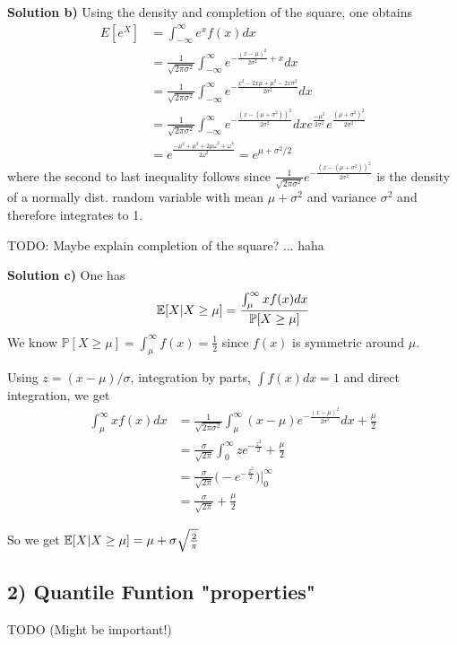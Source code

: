 \textbf{Solution b)}
Using the density and completion of the square, one obtains
\begin{align*}
    E[e^X] &= \int_{-\infty}^\infty e^x f(x)dx \\
           &= \frac{1}{\sqrt{2\pi\sigma^2}}\int_{-\infty}^\infty
              e^{-\frac{(x-\mu)^2}{2\sigma^2} + x} dx \\
           &= \frac{1}{\sqrt{2\pi\sigma^2}}\int_{-\infty}^\infty
              e^{-\frac{x^2-2x\mu+\mu^2-2x\sigma^2}{2\sigma^2}}dx \\
           &= \frac{1}{\sqrt{2\pi\sigma^2}}\int_{-\infty}^\infty
              e^{-\frac{(x-(\mu+\sigma^2))^2}{2\sigma^2}}dx
              e^{\frac{-\mu^2}{2\sigma^2}}e^{\frac{(\mu + \sigma^2)^2}{2\sigma^2}} \\
           &= e^\frac{-\mu^2 + \mu^2 + 2\mu\omega^2 + \omega^4}{2\omega^2}
            = e^{\mu+\sigma^2/2}
\end{align*}
where the second to last inequality follows since $\frac{1}{\sqrt{2\pi\sigma^2}}e^{-\frac{(x-(\mu+\sigma^2))^2}{2\sigma^2}}$ is the
density of a normally dist. random variable with mean $\mu + \sigma^2$ and variance
$\sigma^2$ and therefore integrates to 1. 

TODO: Maybe explain completion of the square? ... haha

\textbf{Solution c)}
One has
\[
    \mathbb{E}[X|X\geq\mu] = \frac{\int_\mu^\infty x f(x) dx}{\mathbb{P}[X\geq\mu]}
\]
We know $\mathbb{P}[X\geq\mu] = \int_\mu^\infty f(x) = \frac{1}{2}$ since $f(x)$ is symmetric
around $\mu$.

Using $z = (x-\mu)/\sigma$, integration by parts, $\int f(x) dx = 1$ and direct
integration, we get
\begin{align*}
    \int_\mu^\infty xf(x) dx &= \frac{1}{\sqrt{2\pi\sigma^2}}\int_\mu^\infty
    (x - \mu)e^{-\frac{(x-\mu)^2}{2\sigma^2}} dx + \frac{\mu}{2} \\
    &= \frac{\sigma}{\sqrt{2\pi}}\int_0^\infty ze^{-\frac{z^2}{2}} + \frac{\mu}{2} \\
    &= \frac{\sigma}{\sqrt{2\pi}}\big(-e^{-\frac{z^2}{2}}\big)\big|_0^\infty \\
    &= \frac{\sigma}{\sqrt{2\pi}} + \frac{\mu}{2}
\end{align*}

So we get $\mathbb{E}[X|X\geq \mu] = \mu + \sigma\sqrt{\frac{2}{\pi}}$

%
%
\subsection*{2) Quantile Funtion "properties"} TODO (Might be important!)

